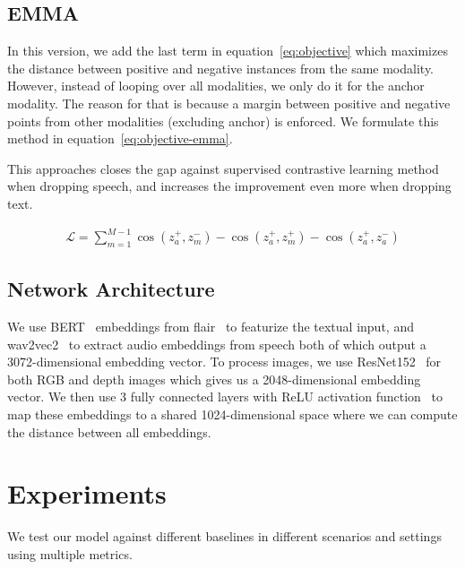 \documentclass[sigconf,natbib=true,anonymous=true]{acmart}
\begin{document}
\subsection{EMMA}
\label{sub:emma}
In this version, we add the last term in equation~\ref{eq:objective} which maximizes the distance between positive and negative instances from the same modality. However, instead of looping over all modalities, we only do it for the anchor modality. The reason for that is because a margin between positive and negative points from other modalities (excluding anchor) is enforced. We formulate this method in equation~\ref{eq:objective-emma}.

This approaches closes the gap against supervised contrastive learning method when dropping speech, and increases the improvement even more when dropping text.

\begin{equation}
\label{eq:objective-emma}
\begin{split}
    \mathcal{L} = \sum_{m=1}^{M-1} \cos(z_{a}^{+} ,z_{m}^{-}) - \cos(z_{a}^{+}, z_{m}^{+}) - \cos(z_{a}^{+}, z_{a}^{-})
\end{split}
\end{equation}


\subsection{Network Architecture}
\label{sec:Model}

We use BERT~\cite{devlin-etal-2019-bert} embeddings from flair~\cite{akbik2019flair,akbik-etal-2019-pooled} to featurize the textual input, and wav2vec2~\cite{wav2vec2} to extract audio embeddings from speech both of which output a 3072-dimensional embedding vector.
To process images, we use ResNet152~\cite{He_resnet_2016} for both RGB and depth images which gives us a 2048-dimensional embedding vector.
We then use 3 fully connected layers with ReLU activation function~\cite{relu2010} to map these embeddings to a shared 1024-dimensional space where we can compute the distance between all embeddings.





\section{Experiments}
\label{sec:Experiments}

We test our model against different baselines in different scenarios and settings using multiple metrics.
\end{document}
